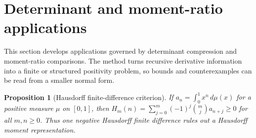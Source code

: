 \documentclass[11pt]{article}
\numberwithin{equation}{section}
\newtheorem{proposition}[theorem]{Proposition}
\theoremstyle{definition}
\theoremstyle{remark}
\newcommand{\1}{\mathbf 1}
\begin{document}
\section{Determinant and moment-ratio applications}
\label{sec:determinant-and-moment-ratio-applications}
This section develops applications governed by determinant compression and moment-ratio comparisons.  The method turns recursive derivative information into a finite or structured positivity problem, so bounds and counterexamples can be read from a smaller normal form.

\begin{proposition}[Hausdorff finite-difference criterion]
\label{res:hausdorffmoment-finitedifference-criterion}
If \(a_n=\int_0^1 x^n\,d\mu(x)\) for a positive measure \(\mu\) on \([0,1]\), then \(H_m(n)=\sum_{j=0}^m(-1)^j\binom mj a_{n+j}\ge0\) for all \(m,n\ge0\). Thus one negative Hausdorff finite difference rules out a Hausdorff moment representation.
\end{proposition}
\end{document}
